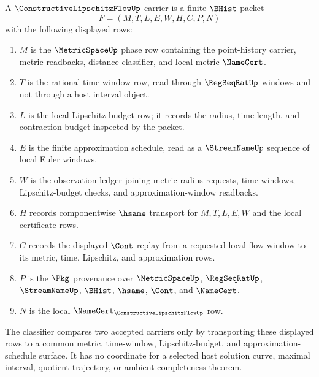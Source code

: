 \begin{definition}
\label{def:constructive-lipschitz-flow-carrier}
A $\ConstructiveLipschitzFlowUp$ carrier is a finite $\BHist$ packet
$$
F=(M,T,L,E,W,H,C,P,N)
$$
with the following displayed rows:
\begin{enumerate}
\item $M$ is the $\MetricSpaceUp$ phase row containing the point-history
carrier, metric readbacks, distance classifier, and local metric
$\NameCert$.
\item $T$ is the rational time-window row, read through $\RegSeqRatUp$
windows and not through a host interval object.
\item $L$ is the local Lipschitz budget row; it records the radius,
time-length, and contraction budget inspected by the packet.
\item $E$ is the finite approximation schedule, read as a $\StreamNameUp$
sequence of local Euler windows.
\item $W$ is the observation ledger joining metric-radius requests, time
windows, Lipschitz-budget checks, and approximation-window readbacks.
\item $H$ records componentwise $\hsame$ transport for $M,T,L,E,W$ and the
local certificate rows.
\item $C$ records the displayed $\Cont$ replay from a requested local flow
window to its metric, time, Lipschitz, and approximation rows.
\item $P$ is the $\Pkg$ provenance over $\MetricSpaceUp$, $\RegSeqRatUp$,
$\StreamNameUp$, $\BHist$, $\hsame$, $\Cont$, and $\NameCert$.
\item $N$ is the local $\NameCert_{\ConstructiveLipschitzFlowUp}$ row.
\end{enumerate}
The classifier compares two accepted carriers only by transporting these
displayed rows to a common metric, time-window, Lipschitz-budget, and
approximation-schedule surface. It has no coordinate for a selected host
solution curve, maximal interval, quotient trajectory, or ambient
completeness theorem.
\end{definition}

